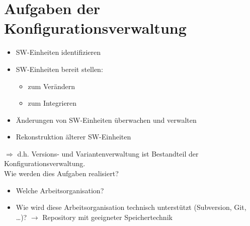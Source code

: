 \documentclass{scrreprt}
\begin{document}
\section{Aufgaben der Konfigurationsverwaltung}
\begin{itemize}
\item SW-Einheiten identifizieren
\item SW-Einheiten bereit stellen:
\begin{itemize}
\item zum Verändern
\item zum Integrieren
\end{itemize}
\item Änderungen von SW-Einheiten überwachen und verwalten
\item Rekonstruktion älterer SW-Einheiten
\end{itemize}
$\Rightarrow$ d.h. Versions- und Variantenverwaltung ist Bestandteil der Konfigurationsverwaltung.\\
Wie werden dies Aufgaben realisiert?
\begin{itemize}
\item Welche Arbeitsorganisation?
\item Wie wird diese Arbeitsorganisation technisch unterstützt (Subversion, Git, …)? $\to$ Repository mit geeigneter Speichertechnik
\end{itemize}
\end{document}
